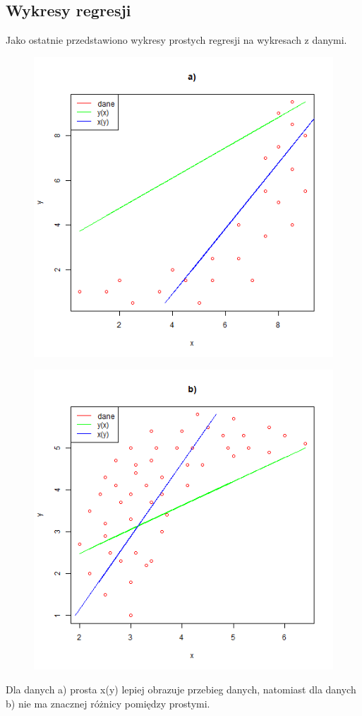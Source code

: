 \documentclass{article}
\begin{document}
\subsection{Wykresy regresji}
Jako ostatnie przedstawiono wykresy prostych regresji na wykresach z danymi.
\begin{figure}[h!]
\begin{center}
\includegraphics[height = 0.5\textheight, angle = 0]{"w11zad1a_r.png"}
\end{center} \end{figure} 

\newpage
\begin{figure}[h!]
\begin{center}
\includegraphics[height = 0.5\textheight, angle = 0]{"w11zad1b_r.png"}
\end{center} \end{figure} 

Dla danych a) prosta x(y) lepiej obrazuje przebieg danych, natomiast dla danych b) nie ma znacznej różnicy pomiędzy prostymi.
\end{document}
